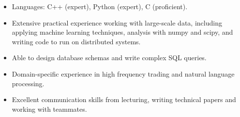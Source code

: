 \documentclass[]{article}
\begin{document}
\begin{itemize}[noitemsep,topsep=0pt]
\item {Languages: C++ (expert), Python (expert), C (proficient).}
\item {Extensive practical experience working with large-scale data, including applying machine learning techniques,
	analysis with numpy and scipy, and writing code to run on distributed systems.}
\item {Able to design database schemas and write complex SQL queries.} 
\item {Domain-specific experience in high frequency trading and natural language processing.}
\item {Excellent communication skills from lecturing, writing technical papers and working with teammates.}
\end{itemize}
\end{document}
